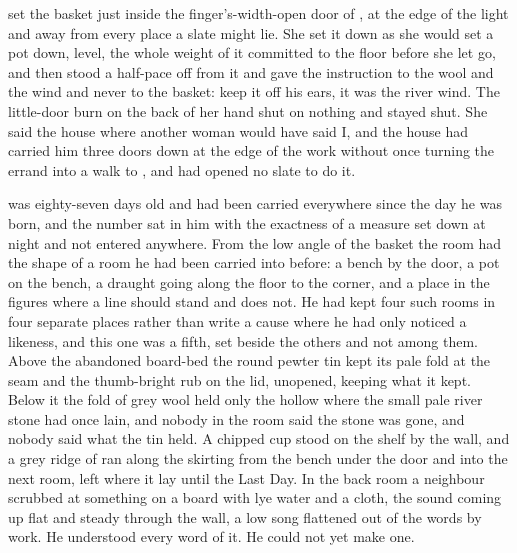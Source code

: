 
 set the basket just inside the finger's-width-open door of , at the edge of the light and away from every place a slate might lie. She set it down as she would set a pot down, level, the whole weight of it committed to the floor before she let go, and then stood a half-pace off from it and gave the instruction to the wool and the wind and never to the basket: keep it off his ears, it was the river wind. The little-door burn on the back of her hand shut on nothing and stayed shut. She said the house where another woman would have said I, and the house had carried him three doors down at the edge of the work without once turning the errand into a walk to , and had opened no slate to do it.

 was eighty-seven days old and had been carried everywhere since the day he was born, and the number sat in him with the exactness of a measure set down at night and not entered anywhere. From the low angle of the basket the room had the shape of a room he had been carried into before: a bench by the door, a pot on the bench, a draught going along the floor to the corner, and a place in the figures where a line should stand and does not. He had kept four such rooms in four separate places rather than write a cause where he had only noticed a likeness, and this one was a fifth, set beside the others and not among them. Above the abandoned board-bed the round pewter tin kept its pale fold at the seam and the thumb-bright rub on the lid, unopened, keeping what it kept. Below it the fold of grey wool held only the hollow where the small pale river stone had once lain, and nobody in the room said the stone was gone, and nobody said what the tin held. A chipped cup stood on the shelf by the wall, and a grey ridge of  ran along the skirting from the bench under the door and into the next room, left where it lay until the Last Day. In the back room a neighbour scrubbed at something on a board with lye water and a cloth, the sound coming up flat and steady through the wall, a low song flattened out of the words by work. He understood every word of it. He could not yet make one.

